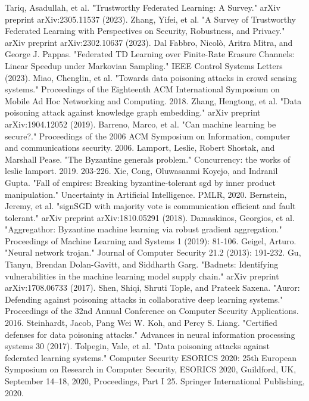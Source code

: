 \documentclass[conference]{IEEEtran}
\begin{document}
\begin{thebibliography}{00}
     Tariq, Asadullah, et al. "Trustworthy Federated Learning: A Survey." arXiv preprint arXiv:2305.11537 (2023).
     Zhang, Yifei, et al. "A Survey of Trustworthy Federated Learning with Perspectives on Security, Robustness, and Privacy." arXiv preprint arXiv:2302.10637 (2023).
     Dal Fabbro, Nicolò, Aritra Mitra, and George J. Pappas. "Federated TD Learning over Finite-Rate Erasure Channels: Linear Speedup under Markovian Sampling." IEEE Control Systems Letters (2023).
     Miao, Chenglin, et al. "Towards data poisoning attacks in crowd sensing systems." Proceedings of the Eighteenth ACM International Symposium on Mobile Ad Hoc Networking and Computing. 2018.
     Zhang, Hengtong, et al. "Data poisoning attack against knowledge graph embedding." arXiv preprint arXiv:1904.12052 (2019).
     Barreno, Marco, et al. "Can machine learning be secure?." Proceedings of the 2006 ACM Symposium on Information, computer and communications security. 2006.
     Lamport, Leslie, Robert Shostak, and Marshall Pease. "The Byzantine generals problem." Concurrency: the works of leslie lamport. 2019. 203-226.
     Xie, Cong, Oluwasanmi Koyejo, and Indranil Gupta. "Fall of empires: Breaking byzantine-tolerant sgd by inner product manipulation." Uncertainty in Artificial Intelligence. PMLR, 2020.
     Bernstein, Jeremy, et al. "signSGD with majority vote is communication efficient and fault tolerant." arXiv preprint arXiv:1810.05291 (2018).
     Damaskinos, Georgios, et al. "Aggregathor: Byzantine machine learning via robust gradient aggregation." Proceedings of Machine Learning and Systems 1 (2019): 81-106.
     Geigel, Arturo. "Neural network trojan." Journal of Computer Security 21.2 (2013): 191-232.
     Gu, Tianyu, Brendan Dolan-Gavitt, and Siddharth Garg. "Badnets: Identifying vulnerabilities in the machine learning model supply chain." arXiv preprint arXiv:1708.06733 (2017).
     Shen, Shiqi, Shruti Tople, and Prateek Saxena. "Auror: Defending against poisoning attacks in collaborative deep learning systems." Proceedings of the 32nd Annual Conference on Computer Security Applications. 2016.
     Steinhardt, Jacob, Pang Wei W. Koh, and Percy S. Liang. "Certified defenses for data poisoning attacks." Advances in neural information processing systems 30 (2017).
     Tolpegin, Vale, et al. "Data poisoning attacks against federated learning systems." Computer Security ESORICS 2020: 25th European Symposium on Research in Computer Security, ESORICS 2020, Guildford, UK, September 14–18, 2020, Proceedings, Part I 25. Springer International Publishing, 2020.

\end{thebibliography}
\end{document}
